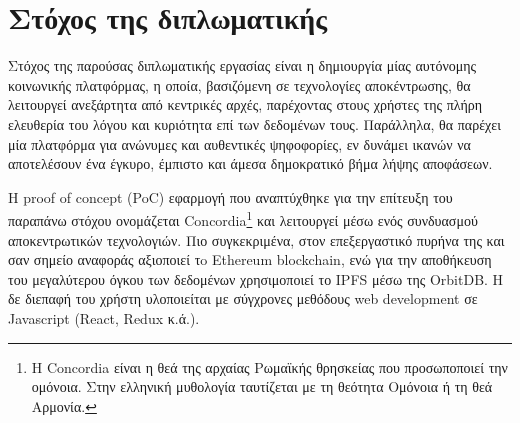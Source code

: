\section{Στόχος της διπλωματικής}\label{section:1-4-thesis-goal}

Στόχος της παρούσας διπλωματικής εργασίας είναι η δημιουργία μίας αυτόνομης κοινωνικής πλατφόρμας, η οποία, βασιζόμενη σε τεχνολογίες αποκέντρωσης, θα λειτουργεί ανεξάρτητα από κεντρικές αρχές, παρέχοντας στους χρήστες της πλήρη ελευθερία του λόγου και κυριότητα επί των δεδομένων τους. Παράλληλα, θα παρέχει μία πλατφόρμα για ανώνυμες και αυθεντικές ψηφοφορίες, εν δυνάμει ικανών να αποτελέσουν ένα έγκυρο, έμπιστο και άμεσα δημοκρατικό βήμα λήψης αποφάσεων.

Η proof of concept (PoC) εφαρμογή που αναπτύχθηκε για την επίτευξη του παραπάνω στόχου ονομάζεται Concordia\footnote{Η Concordia είναι η θεά της αρχαίας Ρωμαϊκής θρησκείας που προσωποποιεί την ομόνοια. Στην ελληνική μυθολογία ταυτίζεται με τη θεότητα Ομόνοια ή τη θεά Αρμονία.} και λειτουργεί μέσω ενός συνδυασμού αποκεντρωτικών τεχνολογιών. Πιο συγκεκριμένα, στον επεξεργαστικό πυρήνα της και σαν σημείο αναφοράς αξιοποιεί τo Ethereum blockchain, ενώ για την αποθήκευση του μεγαλύτερου όγκου των δεδομένων χρησιμοποιεί το IPFS μέσω της OrbitDB. Η δε διεπαφή του χρήστη υλοποιείται με σύγχρονες μεθόδους web development σε Javascript (React, Redux κ.ά.).
